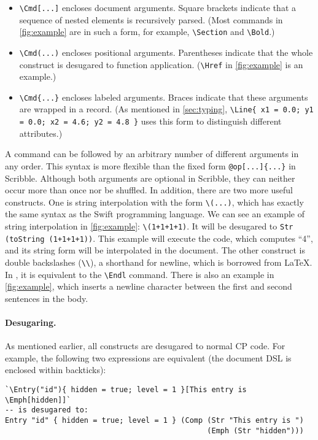 \begin{itemize}
\item \Verb|\Cmd[...]| encloses document arguments. Square brackets indicate
      that a sequence of nested elements is recursively parsed. (Most commands
      in \autoref{fig:example} are in such a form, for example,
      \lstinline|\Section| and \lstinline|\Bold|.)
\item \Verb|\Cmd(...)| encloses positional arguments. Parentheses indicate that
      the whole construct is desugared to function application.
      (\lstinline|\Href| in \autoref{fig:example} is an example.)
\item \Verb|\Cmd{...}| encloses labeled arguments. Braces indicate that these
      arguments are wrapped in a record. (As mentioned in \autoref{sec:typing},
      \lstinline|\Line{ x1 = 0.0; y1 = 0.0; x2 = 4.6; y2 = 4.8 }| uses this form
      to distinguish different attributes.)
\end{itemize}

\noindent
A command can be followed by an arbitrary number of different arguments in any
order. This syntax is more flexible than the fixed form
\lstinline|@op[...]{...}| in Scribble. Although both arguments are optional in
Scribble, they can neither occur more than once nor be shuffled. In addition,
there are two more useful \ExT constructs. One is string interpolation with the
form \lstinline{\(...)}, which has exactly the same syntax as the Swift
programming language. We can see an example of string interpolation in
\autoref{fig:example}: \lstinline|\(1+1+1+1)|. It will be desugared to
\lstinline{Str (toString (1+1+1+1))}. This example will execute the code, which
computes ``4'', and its string form will be interpolated in the document. The
other construct is double backslashes (\lstinline{\\}), a shorthand for newline,
which is borrowed from \LaTeX. In \ExT, it is equivalent to the
\lstinline{\Endl} command. There is also an example in \autoref{fig:example},
which inserts a newline character between the first and second sentences in the
body. 

\paragraph{Desugaring.}
As mentioned earlier, all \ExT constructs are desugared to normal CP code. For
example, the following two expressions are equivalent (the document DSL is
enclosed within backticks):

\begin{lstlisting}
`\Entry("id"){ hidden = true; level = 1 }[This entry is \Emph[hidden]]`
-- is desugared to:
Entry "id" { hidden = true; level = 1 } (Comp (Str "This entry is ")
                                              (Emph (Str "hidden")))
\end{lstlisting}

